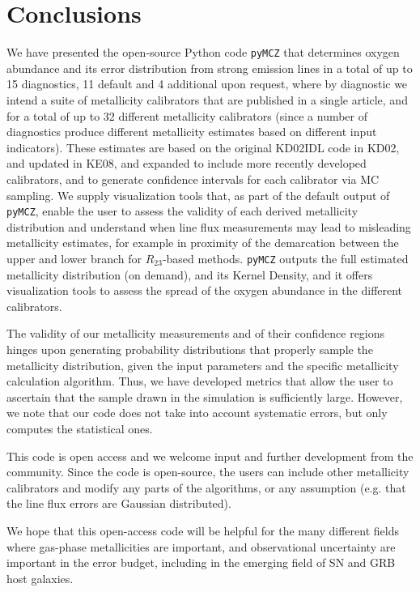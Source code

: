 \documentclass{emulateapj}
\begin{document}
\section{Conclusions}\label{sec:conclusions_sec}
We have presented the open-source Python code \verb=pyMCZ= that
determines oxygen abundance and its error distribution from strong
emission lines in a total of up to 15 diagnostics, 11 default and 4
additional upon request, where by diagnostic we intend a suite of
metallicity calibrators that are published in a single article, and
for a total of up to 32 different metallicity calibrators (since a
number of diagnostics produce different metallicity estimates based on
different input indicators). These estimates are based on the original
KD02IDL code in KD02, and updated in KE08, and expanded to include
more recently developed calibrators, and to generate confidence
intervals for each calibrator via MC sampling. We supply visualization
tools that, as part of the default output of \verb=pyMCZ=, enable the
user to assess the validity of each derived metallicity distribution
and understand when line flux measurements may lead to misleading
metallicity estimates, for example in proximity of the demarcation
between the upper and lower branch for $R_{23}$-based
methods. \verb=pyMCZ= outputs the full estimated metallicity
distribution (on demand), and its Kernel Density, and it offers
visualization tools to assess the spread of the oxygen abundance in
the different calibrators.

The validity of our metallicity measurements and of their confidence
regions hinges upon generating probability distributions that properly
sample the metallicity distribution, given the input parameters and
the specific metallicity calculation algorithm. Thus, we have
developed metrics that allow the user to ascertain that the sample
drawn in the simulation is sufficiently large. However, we note that
our code does not take into account systematic errors, but only
computes the statistical ones.

This code is open access and we welcome input and further development
from the community.  Since the code is open-source, the users can
include other metallicity calibrators and modify any parts of the
algorithms, or any assumption (e.g. that the line flux errors are
Gaussian distributed).

We hope that this open-access code will be helpful for the many
different fields where gas-phase metallicities are important, and
observational uncertainty are important in the error budget, including
in the emerging field of SN and GRB host galaxies.
\end{document}
